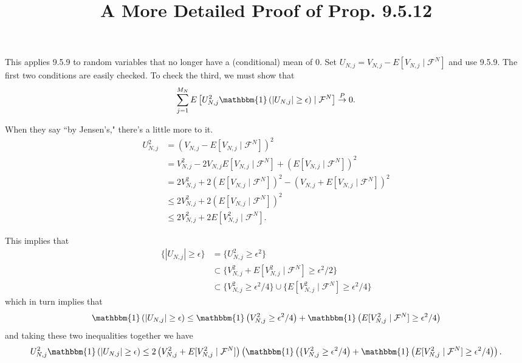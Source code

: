 \documentclass{article}
\title{A More Detailed Proof of Prop. 9.5.12}
\begin{document}
\maketitle

This applies 9.5.9 to random variables that no longer have a (conditional) mean of $0$. Set $U_{N,j} = V_{N,j} - E[V_{N,j} \mid \mathcal{F}^N]$ and use 9.5.9. The first two conditions are easily checked. To check the third, we must show that 
\[
\sum_{j=1}^{M_N} E\left[U_{N,j}^2 \mathbbm{1} \left( |U_{N,j}| \ge \epsilon \right) \mid \mathcal{F}^N \right] \overset{P}{\to} 0.
\]

When they say ``by Jensen's," there's a little more to it.
\begin{align*}
U_{N,j}^2 &= \left(  V_{N,j} - E[V_{N,j} \mid \mathcal{F}^N] \right)^2 \\
&= V_{N,j}^2 - 2V_{N,j}E[V_{N,j} \mid \mathcal{F}^N] + \left( E[V_{N,j} \mid \mathcal{F}^N] \right)^2 \\
&= 2V_{N,j}^2 + 2 \left( E[V_{N,j} \mid \mathcal{F}^N] \right)^2 - \left(V_{N,j} +E[V_{N,j} \mid \mathcal{F}^N]  \right)^2 \\
&\le 2V_{N,j}^2 + 2 \left( E[V_{N,j} \mid \mathcal{F}^N] \right)^2  \\
&\le 2V_{N,j}^2 + 2  E[V_{N,j}^2 \mid \mathcal{F}^N] \tag{Jensen's}.
\end{align*}

This implies that 
\begin{align*}
\{|U_{N,j}| \ge \epsilon \} &= \{U_{N,j}^2 \ge \epsilon^2 \} \\
&\subset \{V_{N,j}^2 +   E[V_{N,j}^2 \mid \mathcal{F}^N] \ge \epsilon^2/2 \} \\
&\subset \{V_{N,j}^2 \ge \epsilon^2/4\}  \cup  \{ E[V_{N,j}^2 \mid \mathcal{F}^N] \ge \epsilon^2/4 \}
\end{align*}
which in turn implies that 
\[
\mathbbm{1} \left( |U_{N,j}| \ge \epsilon \right) \le \mathbbm{1} \left( V_{N,j}^2 \ge \epsilon^2/4 \right) + \mathbbm{1}\left( E[V_{N,j}^2 \mid \mathcal{F}^N] \ge \epsilon^2/4 \right)
\]
and taking these two inequalities together we have
\[
U_{N,j}^2 \mathbbm{1} \left( |U_{N,j}| \ge \epsilon \right) \le 2\left( V_{N,j}^2 +   E[V_{N,j}^2 \mid \mathcal{F}^N]\right) \left( \mathbbm{1} \left( \{V_{N,j}^2 \ge \epsilon^2/4 \right) + \mathbbm{1}\left(  E[V_{N,j}^2 \mid \mathcal{F}^N] \ge \epsilon^2/4 \right) \right).
\]
\end{document}
